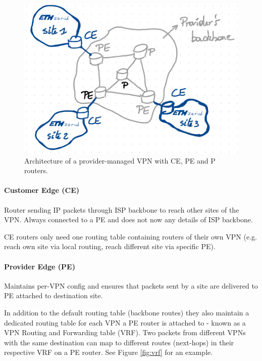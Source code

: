 \begin{figure}[h]
	\centering
	\includegraphics[scale=0.7]{images/3-provider.PNG}
	\caption{Architecture of a provider-managed VPN with CE, PE and P routers.}
	\label{fig:provider}
\end{figure}

\paragraph{Customer Edge (CE)}
Router sending IP packets through ISP backbone to reach other sites of the VPN. Always connected to a PE and does not now any details of ISP backbone.

CE routers only need one routing table containing routers of their own VPN (e.g. reach own site via local routing, reach different site via specific PE).

\paragraph{Provider Edge (PE)}
Maintains per-VPN config and ensures that packets sent by a site are delivered to PE attached to destination site.

In addition to the default routing table (backbone routes) they also maintain a dedicated routing table for each VPN a PE router is attached to - known as a VPN Routing and Forwarding table (VRF). Two packets from different VPNs with the same destination can map to different routes (next-hops) in their respective VRF on a PE router. See Figure \ref{fig:vrf} for an example.

